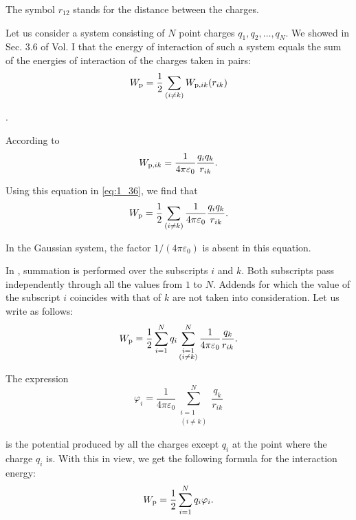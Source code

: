 \noindent
The symbol $r_{12}$ stands for the distance between the charges.

Let us consider a system consisting of $N$ point charges $q_1, q_2, \ldots, q_N$. We showed in Sec. 3.6 of Vol. I that the energy of interaction of such a system equals the sum of the energies of interaction of the charges taken in pairs:
\begin{equation}\label{eq:1_36}
	W_{\text{p}} = \frac{1}{2} \sum_{(i\neq k)} W_{\text{p,$ik$}}(r_{ik})
\end{equation}

.

According to 
\begin{equation*}
	W_{\text{p,$ik$}} = \frac{1}{4\pi\varepsilon_0} \frac{q_i q_k}{r_{ik}}.
\end{equation*}

\noindent
Using this equation in \eqref{eq:1_36}, we find that
\begin{equation}\label{eq:1_37}
	W_{\text{p}} = \frac{1}{2} \sum_{(i\neq k)} \frac{1}{4\pi\varepsilon_0} \frac{q_i q_k}{r_{ik}}.
\end{equation}

In the Gaussian system, the factor $1/(4\pi\varepsilon_0)$ is absent in this equation.

In , summation is performed over the subscripts $i$ and $k$. Both subscripts pass independently through all the values from $1$ to $N$. Addends for which the value of the subscript $i$ coincides with that of $k$ are not taken into consideration. Let us write 
as follows:
\begin{equation}\label{eq:1_38}
	W_{\text{p}} = \frac{1}{2} \sum_{i=1}^N q_i \sum_{\substack{{i=1}\\ (i\neq k)}}^N \frac{1}{4\pi\varepsilon_0} \frac{q_k}{r_{ik}}.
\end{equation}

\noindent
The expression
\begin{equation*}
	\varphi_i =  \frac{1}{4\pi\varepsilon_0} \sum_{\substack{{i=1}\\ (i\neq k)}}^N \frac{q_k}{r_{ik}}
\end{equation*}

\noindent
is the potential produced by all the charges except $q_i$ at the point where the charge $q_i$ is. With this in view, we get the following formula for the interaction energy:
\begin{equation}\label{eq:1_39}
	W_{\text{p}} = \frac{1}{2} \sum_{i=1}^N q_i \varphi_i.
\end{equation}

